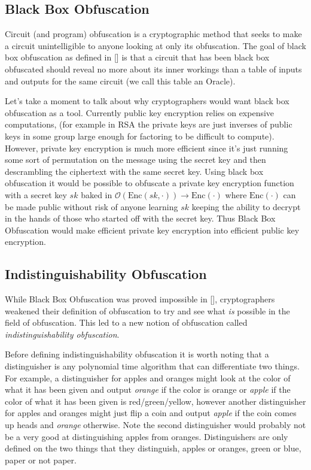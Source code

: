 \documentclass[12pt,twoside]{reedthesis}
\newcommand{\enc}[0]{\text{Enc}}
\begin{document}
    \subsection{Black Box Obfuscation}
     \par Circuit (and program) obfuscation is a cryptographic method that seeks to make a circuit unintelligible to anyone looking at only its obfuscation. The goal of black box obfuscation as defined in [\cite{vbb}] is that a circuit that has been black box obfuscated should reveal no more about its inner workings than a table of inputs and outputs for the same circuit (we call this table an Oracle).
         
     \par Let's take a moment to talk about why cryptographers would want black box obfuscation as a tool. Currently public key encryption relies on expensive computations, (for example in RSA the private keys are just inverses of public keys in some group large enough for factoring to be difficult to compute). However, private key encryption is much more efficient since it's just running some sort of permutation on the message using the secret key and then descrambling the ciphertext with the same secret key. Using black box obfuscation it would be possible to obfuscate a private key encryption function with a secret key $sk$ baked in $\mathcal{O}(\enc(sk,\cdot)) \rightarrow \enc(\cdot)$ where $\enc(\cdot)$ can be made public without risk of anyone learning $sk$ keeping the ability to decrypt in the hands of those who started off with the secret key. Thus Black Box Obfuscation would make efficient private key encryption into efficient public key encryption.
    
    
    
    \subsection{Indistinguishability Obfuscation}
   
   
    While Black Box Obfuscation was proved impossible in [\cite{vbb}], cryptographers weakened their definition of obfuscation to try and see what \textit{is} possible in the field of obfuscation. This led to a new notion of obfuscation called \textit{indistinguishability obfuscation}. 
    \par Before defining indistinguishability obfuscation it is worth noting that a distinguisher is any polynomial time algorithm that can differentiate two things. For example, a distinguisher for apples and oranges might look at the color of what it has been given and output  \textit{orange} if the color is orange or \textit{apple} if the color of what it has been given is red/green/yellow, however another distinguisher for apples and oranges might just flip a coin and output \textit{apple} if the coin comes up heads and \textit{orange} otherwise. Note the second distinguisher would probably not be a very good at distinguishing apples from oranges. Distinguishers are only defined on the two things that they distinguish, apples or oranges, green or blue, paper or not paper.
       \newcommand{\iO}[0]{\textit{i}\mathcal{O}}
    
\end{document}
